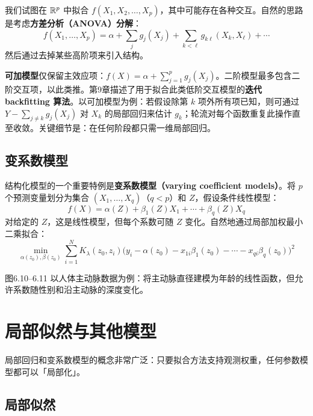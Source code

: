 我们试图在 $\mathbb{R}^p$ 中拟合 $f(X_1, X_2, \ldots, X_p)$，其中可能存在各种交互。自然的思路是考虑\textbf{方差分析（ANOVA）分解}：
\begin{equation}\label{eq:anova_decomp}
    f(X_1, \ldots, X_p) = \alpha + \sum_j g_j(X_j) + \sum_{k<\ell} g_{k\ell}(X_k, X_\ell) + \cdots
\end{equation}
然后通过去掉某些高阶项来引入结构。

\textbf{可加模型}仅保留主效应项：$f(X) = \alpha + \sum_{j=1}^{p} g_j(X_j)$。二阶模型最多包含二阶交互项，以此类推。第9章描述了用于拟合此类低阶交互模型的\textbf{迭代 backfitting 算法}。以可加模型为例：若假设除第 $k$ 项外所有项已知，则可通过 $Y - \sum_{j \neq k} g_j(X_j)$ 对 $X_k$ 的局部回归来估计 $g_k$；轮流对每个函数重复此操作直至收敛。关键细节是：在任何阶段都只需一维局部回归。

\subsection{变系数模型}

结构化模型的一个重要特例是\textbf{变系数模型（varying coefficient models）}。将 $p$ 个预测变量划分为集合 $(X_1, \ldots, X_q)$（$q < p$）和 $Z$，假设条件线性模型：
\begin{equation}\label{eq:varying_coef}
    f(X) = \alpha(Z) + \beta_1(Z) X_1 + \cdots + \beta_q(Z) X_q
\end{equation}
对给定的 $Z$，这是线性模型，但每个系数可随 $Z$ 变化。自然地通过局部加权最小二乘拟合：
\begin{equation}\label{eq:varying_coef_fit}
    \min_{\alpha(z_0), \beta(z_0)} \sum_{i=1}^{N} K_\lambda(z_0, z_i) \bigl(y_i - \alpha(z_0) - x_{1i}\beta_1(z_0) - \cdots - x_{qi}\beta_q(z_0)\bigr)^2
\end{equation}

图6.10--6.11 以人体主动脉数据为例：将主动脉直径建模为年龄的线性函数，但允许系数随性别和沿主动脉的深度变化。

\section{局部似然与其他模型}

局部回归和变系数模型的概念非常广泛：只要拟合方法支持观测权重，任何参数模型都可以「局部化」。

\subsection{局部似然}

